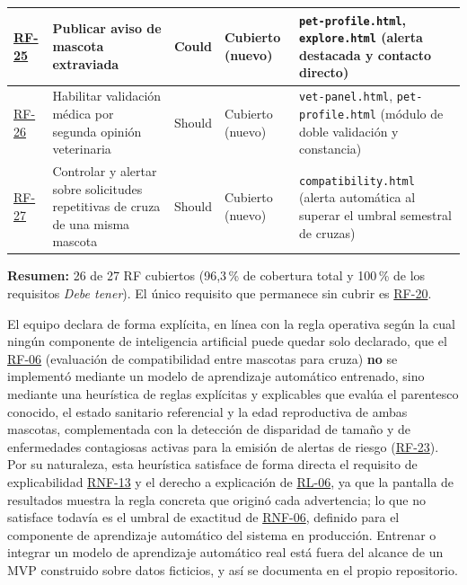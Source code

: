 \documentclass[journal,onecolumn]{IEEEtran}
\begin{document}
\begin{longtable}{@{}p{1.5cm} p{5.2cm} p{1.7cm} p{3.0cm} p{3.4cm}@{}}
		\hline
		\hyperref[tab:RF-25]{RF-25} & Publicar aviso de mascota extraviada & Could & Cubierto (nuevo) & \texttt{pet-profile.html}, \texttt{explore.html} (alerta destacada y contacto directo) \\
		\hline
		\hyperref[tab:RF-26]{RF-26} & Habilitar validación médica por segunda opinión veterinaria & Should & Cubierto (nuevo) & \texttt{vet-panel.html}, \texttt{pet-profile.html} (módulo de doble validación y constancia) \\
		\hline
		\hyperref[tab:RF-27]{RF-27} & Controlar y alertar sobre solicitudes repetitivas de cruza de una misma mascota & Should & Cubierto (nuevo) & \texttt{compatibility.html} (alerta automática al superar el umbral semestral de cruzas) \\
	\end{longtable}
	
	\textbf{Resumen:} 26 de 27 RF cubiertos (96,3\,\% de cobertura total y
	100\,\% de los requisitos \emph{Debe tener}). El único requisito que
	permanece sin cubrir es \hyperref[tab:RF-20]{RF-20}.

	El equipo declara de forma explícita, en línea con la regla operativa según
	la cual ningún componente de inteligencia artificial puede quedar solo
	declarado, que el \hyperref[tab:RF-06]{RF-06} (evaluación de compatibilidad entre mascotas para
	cruza) \textbf{no} se implementó mediante un modelo de aprendizaje
	automático entrenado, sino mediante una heurística de reglas explícitas y
	explicables que evalúa el parentesco conocido, el estado sanitario
	referencial y la edad reproductiva de ambas mascotas, complementada con la
	detección de disparidad de tamaño y de enfermedades contagiosas activas
	para la emisión de alertas de riesgo (\hyperref[tab:RF-23]{RF-23}). Por su naturaleza, esta
	heurística satisface de forma directa el requisito de explicabilidad
	\hyperref[tab:RNF-13]{RNF-13} y el derecho a explicación de \hyperref[rl:06]{RL-06}, ya que la pantalla de
	resultados muestra la regla concreta que originó cada advertencia; lo que
	no satisface todavía es el umbral de exactitud de \hyperref[tab:RNF-06]{RNF-06}, definido para el
	componente de aprendizaje automático del sistema en producción. Entrenar o
	integrar un modelo de aprendizaje automático real está fuera del alcance de
	un MVP construido sobre datos ficticios, y así se documenta en el propio
	repositorio.
\end{document}
